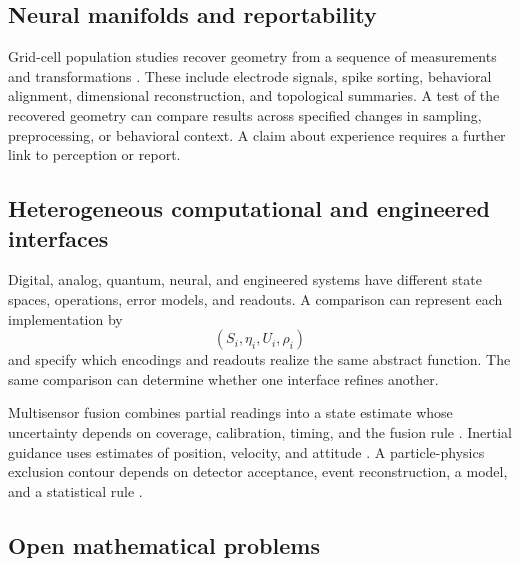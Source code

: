 \subsection{Neural manifolds and reportability}

Grid-cell population studies recover geometry from a sequence of measurements and transformations \parencite{Gardner2022,Hermansen2024,DiSarra2025}. These include electrode signals, spike sorting, behavioral alignment, dimensional reconstruction, and topological summaries. A test of the recovered geometry can compare results across specified changes in sampling, preprocessing, or behavioral context. A claim about experience requires a further link to perception or report.


\subsection{Heterogeneous computational and engineered interfaces}

Digital, analog, quantum, neural, and engineered systems have different state spaces, operations, error models, and readouts. A comparison can represent each implementation by
\[
(S_i,\eta_i,U_i,\rho_i)
\]
and specify which encodings and readouts realize the same abstract function. The same comparison can determine whether one interface refines another.

Multisensor fusion combines partial readings into a state estimate whose uncertainty depends on coverage, calibration, timing, and the fusion rule \parencite{HallLlinas1997,DurrantWhyteHenderson2008}. Inertial guidance uses estimates of position, velocity, and attitude \parencite{Kalman1963,TittertonWeston2004}. A particle-physics exclusion contour depends on detector acceptance, event reconstruction, a model, and a statistical rule \parencite{Cowan2011,ParticleDataGroup2026}.

\subsection{Open mathematical problems}

